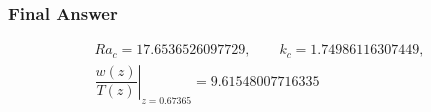 \subsubsection*{Final Answer}

\[
\boxed{
\begin{gathered}
Ra_c=17.6536526097729,\qquad
k_c=1.74986116307449,\\
\left.\dfrac{w(z)}{T(z)}\right|_{z=0.67365}=9.61548007716335
\end{gathered}
}
\]
